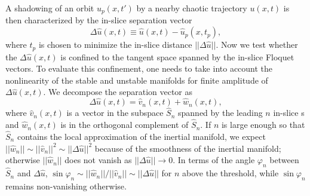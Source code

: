 A shadowing of
an orbit $u_{p}(x,t')$ by a nearby chaotic trajectory $u(x,t)$ is
then characterized by the in-slice separation vector
\begin{equation}
  \label{eq:dif}
  \Delta \hat{u}(x,t) \equiv \hat{u}(x, t) -\hat{u}_{p}(x, t_{p}),
\end{equation}
where $t_{p}$ is chosen to minimize the in-slice distance
$||\Delta\hat{u}||$.
Now we test whether the $\Delta{}\hat{u}(x,t)$ is
confined to the tangent space spanned by the {\entangled} in-slice Floquet
vectors. To evaluate this confinement, one needs to take into account the
nonlinearity of the stable and unstable manifolds for finite
amplitude of $\Delta\hat{u}(x,t)$.
We decompose the separation vector as
\begin{equation}
  \Delta\hat{u}(x,t)=\hat{v}_n(x,t)+\hat{w}_n(x,t),  \label{eq:DiffVec}
\end{equation}
where $\hat{v}_n(x,t)$ is a vector in the subspace $\hat{S}_n$ spanned by
the leading $n$ in-slice \Fv s and $\hat{w}_n(x,t)$ is in
the orthogonal complement
of $\hat{S}_n$. If $n$ is large enough so that $\hat{S}_n$
contains the local approximation of the inertial manifold, we expect
$||\hat{w}_n||\sim||\hat{v}_n||^2\sim||\Delta\hat{u}||^2$ because of the
smoothness of the inertial manifold;
otherwise $||\hat{w}_n||$ does not vanish as $||\Delta\hat{u}||\to{}0$.
In terms of the angle $\varphi_n$ between $\hat{S}_n$ and
$\Delta\hat{u}$,
$\sin\varphi_n\sim||\hat{w}_n||/||\hat{v}_n||\sim||\Delta\hat{u}||$ for
$n$ above the threshold, while $\sin\varphi_n$ remains non-vanishing
otherwise.


